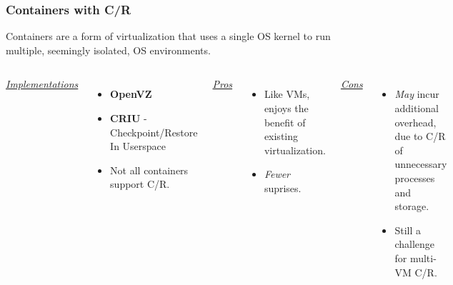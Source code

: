 \documentclass[compress]{beamer}
\begin{document}

\begin{frame}
\frametitle{Containers with C/R}
Containers are a form of virtualization that uses a single OS
kernel to run multiple, seemingly isolated, OS environments.
\begin{columns}[t]
\ul{\textit{Implementations}}
\begin{itemize}
\item \textbf{OpenVZ}
\item \textbf{CRIU} - Checkpoint/Restore In Userspace
\item Not all containers support C/R.
\end{itemize}

\ul{\textit{Pros}}
\begin{itemize}
\item Like VMs, enjoys the benefit of existing virtualization.
\item \textit{Fewer} suprises.
\end{itemize}

\ul{\textit{Cons}}
\begin{itemize}
\item \textit{May} incur additional overhead, due to C/R of unnecessary processes and storage.
\item Still a challenge for multi-VM C/R.
\end{itemize}

\end{columns}

\end{frame}
  
\end{document}
